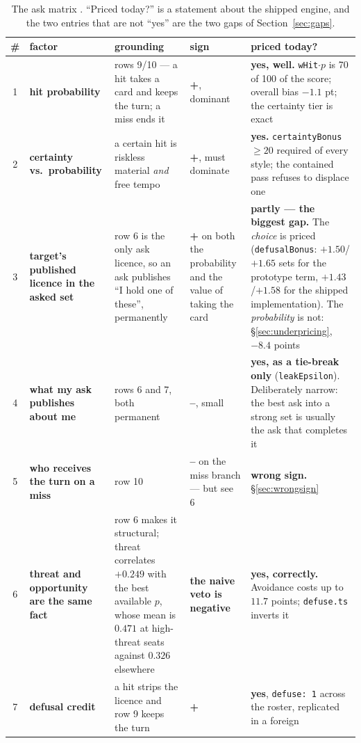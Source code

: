 \documentclass[11pt]{article}
\newcommand{\code}[1]{\texttt{#1}}
\begin{document}
\begin{table}[p]
\centering
\caption{The ask matrix \cite{asking}. ``Priced today?'' is a statement about the shipped
engine, and the two entries that are not ``yes'' are the two gaps of
Section~\ref{sec:gaps}.}
\label{tab:matrix}
\footnotesize
\begin{tabular}{@{}c p{} p{} p{} p{}@{}}
\toprule
\# & factor & grounding & sign & priced today? \\
\midrule
1 & \textbf{hit probability} & rows 9/10 --- a hit takes a card and keeps the turn; a miss
  ends it & \textbf{+}, dominant & \textbf{yes, well.} \code{wHit}$\cdot p$ is 70 of 100 of
  the score; overall bias $-1.1$ pt; the certainty tier is exact \\
2 & \textbf{certainty vs.\ probability} & a certain hit is riskless material \emph{and}
  free tempo & \textbf{+}, must dominate & \textbf{yes.} \code{certaintyBonus} $\ge 20$
  required of every style; the contained pass refuses to displace one \\
3 & \textbf{target's published licence in the asked set} & row 6 is the only ask licence,
  so an ask publishes ``I hold one of these'', permanently & \textbf{+} on both the
  probability and the value of taking the card & \textbf{partly --- the biggest gap.} The
  \emph{choice} is priced (\code{defusalBonus}: $+1.50$/$+1.65$ sets for the prototype
  term, $+1.43$/$+1.58$ for the shipped implementation). The
  \emph{probability} is not: \S\ref{sec:underpricing}, $-8.4$ points \\
4 & \textbf{what my ask publishes about me} & rows 6 and 7, both permanent
  & \textbf{--}, small & \textbf{yes, as a tie-break only} (\code{leakEpsilon}).
  Deliberately narrow: the best ask into a strong set is usually the ask that completes
  it \\
5 & \textbf{who receives the turn on a miss} & row 10 & \textbf{--} on the miss branch ---
  but see 6 & \textbf{wrong sign.} \S\ref{sec:wrongsign} \\
6 & \textbf{threat and opportunity are the same fact} & row 6 makes it structural; threat
  correlates $+0.249$ with the best available $p$, whose mean is $0.471$ at high-threat
  seats against $0.326$ elsewhere & \textbf{the naive veto is negative}
  & \textbf{yes, correctly.} Avoidance costs up to $11.7$ points; \code{defuse.ts} inverts
  it \\
7 & \textbf{defusal credit} & a hit strips the licence and row 9 keeps the turn
  & \textbf{+} & \textbf{yes}, \mbox{\code{defuse: 1}} across the roster, replicated in a foreign

\end{tabular}
\end{table}
\end{document}
